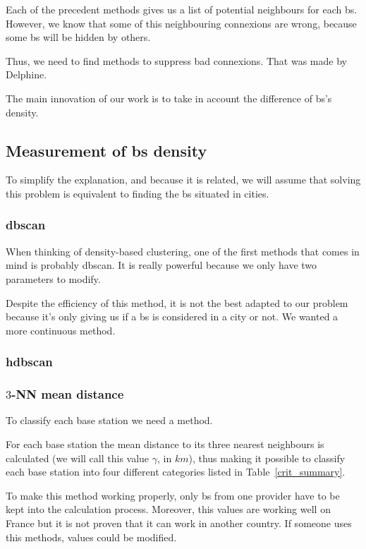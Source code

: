 \documentclass[lettersize,journal,english]{IEEEtran}
\begin{document}
\noindent Each of the precedent methods gives us a list of potential neighbours for each \acrshort{bs}. However, we know that some of this neighbouring connexions are wrong,
because some \acrshort{bs} will be \og hidden\fg{} by others.

Thus, we need to find methods to suppress bad connexions. That was made by Delphine.

The main innovation of our work is to take in account the difference of \acrshort{bs}'s density.

\subsection{Measurement of \acrshort{bs} density}
\noindent To simplify the explanation, and because it is related, we will assume that solving this problem is equivalent to finding the \acrshort{bs} situated in \og cities\fg{}.

\subsubsection{\acrshort{dbscan}}
When thinking of density-based clustering, one of the first methods that comes in mind is probably \acrshort{dbscan}.
It is really powerful because we only have two parameters to modify.

Despite the efficiency of this method, it is not the best adapted to our problem because it's only giving us if a \acrshort{bs} is considered in a city or not.
We wanted a more continuous method.

\subsubsection{\acrshort{hdbscan}}

\subsubsection{$3$-NN mean distance}
To classify each base station we need a method.

For each base station the mean distance to its three nearest neighbours is calculated (we will call this value $\gamma$, in $\unit{km}$), thus making it possible to classify each base station into four different categories listed in Table~\ref{crit_summary}.

To make this method working properly, only \acrshort{bs} from one provider have to be kept into the calculation process.
Moreover, this values are working well on France but it is not proven that it can work in another country. If someone uses this methods, values could be modified.
\end{document}

